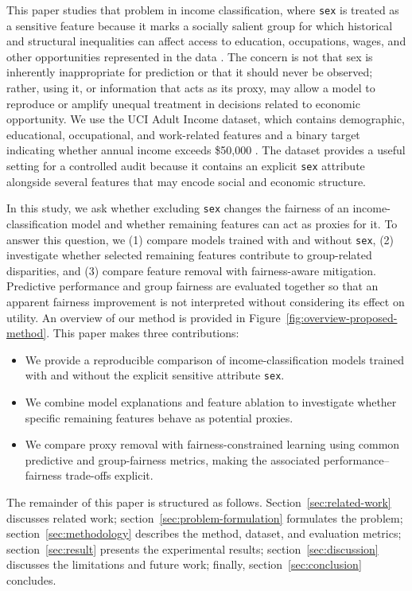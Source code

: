 \documentclass{article}
\begin{document}
This paper studies that problem in income classification, where
\texttt{sex} is treated as a sensitive feature because it marks a socially
salient group for which historical and structural inequalities can affect
access to education, occupations, wages, and other opportunities represented in
the data \citep{mehrabi2021survey,barocas2019fairness}. The concern is not that
sex is inherently inappropriate for prediction or that it should never be
observed; rather, using it, or information that acts as its proxy, may allow a
model to reproduce or amplify unequal treatment in decisions related to
economic opportunity. We use the UCI Adult Income dataset, which contains
demographic, educational, occupational, and work-related features and a
binary target indicating whether annual income exceeds \$50{,}000
\citep{dua2019uci}. The dataset provides a useful setting for a controlled
audit because it contains an explicit \texttt{sex} attribute alongside several
features that may encode social and economic structure. 

In this study, we ask whether excluding \texttt{sex} changes the fairness of an
income-classification model and whether remaining features can act as proxies
for it. To answer this question, we (1) compare models trained with and without
\texttt{sex}, (2) investigate whether selected remaining features contribute to
group-related disparities, and (3) compare feature removal with fairness-aware
mitigation. Predictive performance and group fairness are evaluated together
so that an apparent fairness improvement is not interpreted without considering
its effect on utility. An overview of our method is provided in 
Figure~\ref{fig:overview-proposed-method}. This paper makes three contributions:
\begin{itemize}
  \item We provide a reproducible comparison of income-classification models
  trained with and without the explicit sensitive attribute \texttt{sex}.
  \item We combine model explanations and feature ablation to investigate whether
  specific remaining features behave as potential proxies.
  \item We compare proxy removal with fairness-constrained learning using
  common predictive and group-fairness metrics, making the associated
  performance--fairness trade-offs explicit.
\end{itemize}

The remainder of this paper is structured as follows. Section~\ref{sec:related-work}
discusses related work; section~\ref{sec:problem-formulation} formulates the problem;
section~\ref{sec:methodology} describes the method,
dataset, and evaluation metrics; section~\ref{sec:result} presents the experimental results;
section~\ref{sec:discussion} discusses the limitations and future work; finally, 
section~\ref{sec:conclusion} concludes.
\end{document}
